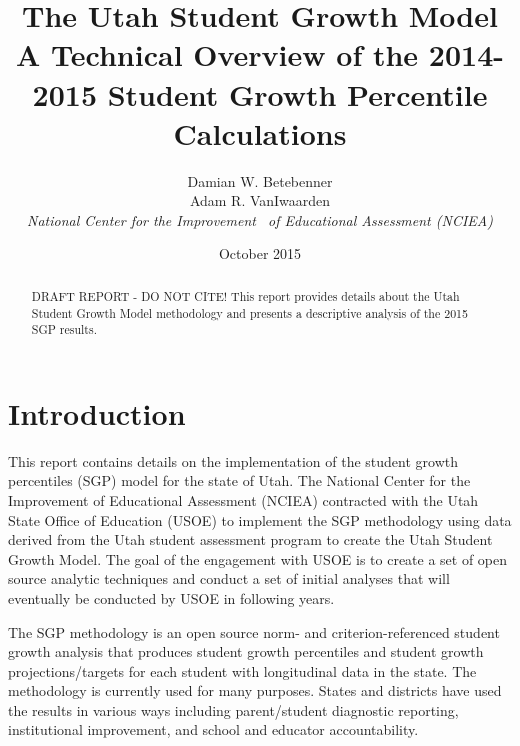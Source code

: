 \documentclass[12pt]{article}
\begin{document}
\newcommand{\pl}[1]{\textsf{PL#1}}
\newcommand{\Cov}{\ensuremath{\mbox{\textsf{Cov}}}}
\newcommand{\Diag}{\ensuremath{\mbox{\textsf{Diag}}}}
\newcommand{\Bias}{\ensuremath{\mbox{\textsf{Bias}}}}
\newcommand{\Astar}[1]{\ensuremath{#1^{^*}}}
\thispagestyle{plain}
\pagestyle{damian}

\title{\textsf{\LARGE The Utah Student Growth Model  \\\medskip A Technical Overview of the 2014-2015 Student Growth Percentile
Calculations }}
\author{  Damian W. Betebenner    \\   Adam R. VanIwaarden    \\   \emph{National Center for the Improvement \ of Educational Assessment (NCIEA)}   }

 \date{October 2015} 

\maketitle

\newpage

\begin{abstract}
DRAFT REPORT - DO NOT CITE! This report provides details about the Utah
Student Growth Model methodology and presents a descriptive analysis of
the 2015 SGP results.
\end{abstract}
\newpage

\section{Introduction}\label{introduction}

This report contains details on the implementation of the student growth
percentiles (SGP) model for the state of Utah. The National Center for
the Improvement of Educational Assessment (NCIEA) contracted with the
Utah State Office of Education (USOE) to implement the SGP methodology
using data derived from the Utah student assessment program to create
the Utah Student Growth Model. The goal of the engagement with USOE is
to create a set of open source analytic techniques and conduct a set of
initial analyses that will eventually be conducted by USOE in following
years.

The SGP methodology is an open source norm- and criterion-referenced
student growth analysis that produces student growth percentiles and
student growth projections/targets for each student with longitudinal
data in the state. The methodology is currently used for many purposes.
States and districts have used the results in various ways including
parent/student diagnostic reporting, institutional improvement, and
school and educator accountability.
\end{document}
